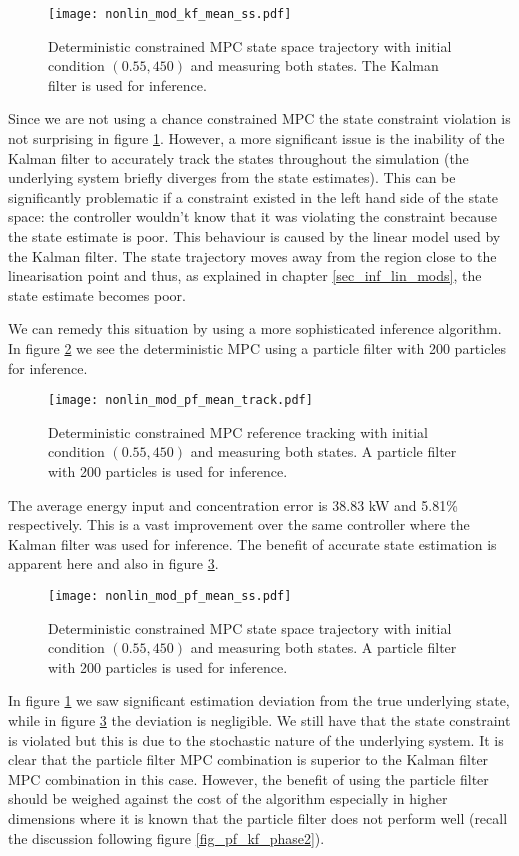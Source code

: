 \begin{figure}[H] 
\centering
\texttt{[image: nonlin\_mod\_kf\_mean\_ss.pdf]}
\caption{Deterministic constrained MPC state space trajectory with initial condition $(0.55, 450)$ and measuring both states. The Kalman filter is used for inference.}
\label{fig_nonlin_mod_kf_mean_ss}
\end{figure}
Since we are not using a chance constrained MPC the state constraint violation is not surprising in figure \ref{fig_nonlin_mod_kf_mean_ss}. However, a more significant issue is the inability of the Kalman filter to accurately track the states throughout the simulation (the underlying system briefly diverges from the state estimates). This can be significantly problematic if a constraint existed in the left hand side of the state space: the controller wouldn't know that it was violating the constraint because the state estimate is poor. This behaviour is caused by the linear model used by the Kalman filter. The state trajectory moves away from the region close to the linearisation point and thus, as explained in chapter \ref{sec_inf_lin_mods}, the state estimate becomes poor.

We can remedy this situation by using a more sophisticated inference algorithm. In figure \ref{fig_nonlin_mod_pf_mean_track} we see the deterministic MPC using a particle filter with 200 particles for inference. 
\begin{figure}[H] 
\centering
\texttt{[image: nonlin\_mod\_pf\_mean\_track.pdf]}
\caption{Deterministic constrained MPC reference tracking with initial condition $(0.55, 450)$ and measuring both states. A particle filter with 200 particles is used for inference.}
\label{fig_nonlin_mod_pf_mean_track}
\end{figure} 
The average energy input and concentration error is 38.83 kW and 5.81\% respectively. This is a vast improvement over the same controller where the Kalman filter was used for inference. The benefit of accurate state estimation is apparent here and also in figure \ref{fig_nonlin_mod_pf_mean_ss}.
\begin{figure}[H] 
\centering
\texttt{[image: nonlin\_mod\_pf\_mean\_ss.pdf]}
\caption{Deterministic constrained MPC state space trajectory with initial condition $(0.55, 450)$ and measuring both states. A particle filter with 200 particles is used for inference.}
\label{fig_nonlin_mod_pf_mean_ss}
\end{figure}
In figure \ref{fig_nonlin_mod_kf_mean_ss} we saw significant estimation deviation from the true underlying state, while in figure \ref{fig_nonlin_mod_pf_mean_ss} the deviation is negligible. We still have that the state constraint is violated but this is due to the stochastic nature of the underlying system. It is clear that the particle filter MPC combination is superior to the Kalman filter MPC combination in this case. However, the benefit of using the particle filter should be weighed against the cost of the algorithm especially in higher dimensions where it is known that the particle filter does not perform well (recall the discussion following figure \ref{fig_pf_kf_phase2}).

